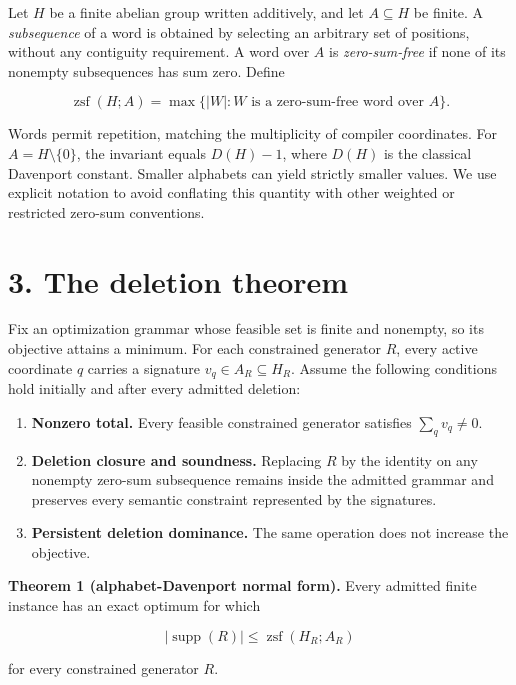 \documentclass[
  11pt,
]{article}
\providecommand{\tightlist}{%
  \setlength{\itemsep}{0pt}\setlength{\parskip}{0pt}}
\begin{document}
Let \(H\) be a finite abelian group written additively, and let
\(A\subseteq H\) be finite. A \emph{subsequence} of a word is obtained
by selecting an arbitrary set of positions, without any contiguity
requirement. A word over \(A\) is \emph{zero-sum-free} if none of its
nonempty subsequences has sum zero. Define

\[
\operatorname{zsf}(H; A)
=\max\{|W|:W\text{ is a zero-sum-free word over }A\}.
\]

Words permit repetition, matching the multiplicity of compiler
coordinates. For \(A=H\setminus\{0\}\), the invariant equals \(D(H)-1\),
where \(D(H)\) is the classical Davenport constant. Smaller alphabets
can yield strictly smaller values. We use explicit notation to avoid
conflating this quantity with other weighted or restricted zero-sum
conventions.

\hypertarget{the-deletion-theorem}{%
\section{3. The deletion theorem}\label{the-deletion-theorem}}

Fix an optimization grammar whose feasible set is finite and nonempty,
so its objective attains a minimum. For each constrained generator
\(R\), every active coordinate \(q\) carries a signature
\(v_q\in A_R\subseteq H_R\). Assume the following conditions hold
initially and after every admitted deletion:

\begin{enumerate}
\def\labelenumi{\arabic{enumi}.}
\tightlist
\item
  \textbf{Nonzero total.} Every feasible constrained generator satisfies
  \(\sum_q v_q\ne0\).
\item
  \textbf{Deletion closure and soundness.} Replacing \(R\) by the
  identity on any nonempty zero-sum subsequence remains inside the
  admitted grammar and preserves every semantic constraint represented
  by the signatures.
\item
  \textbf{Persistent deletion dominance.} The same operation does not
  increase the objective.
\end{enumerate}

\textbf{Theorem 1 (alphabet-Davenport normal form).} Every admitted
finite instance has an exact optimum for which

\[
|\operatorname{supp}(R)|\le \operatorname{zsf}(H_R; A_R)
\]

for every constrained generator \(R\).
\end{document}
